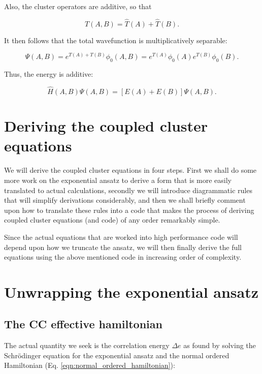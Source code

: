 Also, the cluster operators are additive, so that

\begin{equation}
\hat{T}(A,B) = \hat{T}(A) + \hat{T}(B) .
\end{equation}

It then follows that the total wavefunction is multiplicatively separable:

\begin{equation}
\Psi(A,B) = e^{T(A) + T(B)}\phi_0(A,B) = e^{T(A)}\phi_0(A)e^{T(B)}\phi_0(B).
\end{equation}

Thus, the energy is additive:

\begin{equation}
\hat{H}(A,B)\Psi(A,B) = [E(A) + E(B)]\Psi(A,B).
\end{equation}


\section{Deriving the coupled cluster equations}

We will derive the coupled cluster equations in four steps. First we shall do some more work on the exponential ansatz to derive a form that is more easily translated to actual calculations, secondly we will introduce diagrammatic rules that will simplify derivations considerably, and then we shall briefly comment upon how to translate these rules into a code that makes the process of deriving coupled cluster equations (and code) of any order remarkably simple. 

Since the actual equations that are worked into high performance code will depend upon how we truncate the ansatz, we will then finally derive the full equations using the above mentioned code in increasing order of complexity. 

\section{Unwrapping the exponential ansatz}

\subsection{The CC effective hamiltonian}

The actual quantity we seek is the correlation energy $\Delta e$ as found by solving the Schrödinger equation for the exponential ansatz and the normal ordered Hamiltonian (Eq. \ref{eqn:normal_ordered_hamiltonian}):

